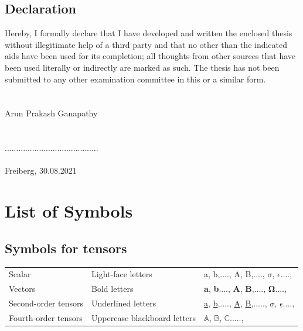 \documentclass[12pt,a4paper,twoside,openright]{report}
\begin{document}
\clearpage
\thispagestyle{empty}
\hfill
\clearpage
\vspace*{2cm}
\section*{\LARGE{Declaration} }
\vspace*{1cm}
\indent\indent\indent Hereby, I  formally declare that I  have developed and written the enclosed thesis 
without illegitimate help of a third party and that no other than the indicated aids have been used for its completion; all thoughts from other sources that have been used literally or indirectly are marked as such. The thesis has not been submitted to any other examination committee in this or a similar form.\\\\\\ Arun Prakash Ganapathy  \\\\\\ .........................................  \\\\ Freiberg, 30.08.2021





\tableofcontents
\listoffigures
\listoftables


\chapter*{List of Symbols}

\section*{Symbols for tensors}
\begin{tabular}{l l l}
Scalar  &  Light-face letters  &  a, b,...., A, B,...., $\sigma$, $\epsilon$....,\\
Vectors &  Bold letters        &  \textbf{a}, \textbf{b}...., \textbf{A}, \textbf{B},...., $\mathbf{\Omega}$....,\\
Second-order tensors  &  Underlined letters  &  \underline{a}, \underline{b},...., \underline{A}, \underline{B},....., $\underline{\sigma}$, $\underline{\epsilon}$....,\\  
Fourth-order tensors   &  Uppercase blackboard letters  &   $\mathbb{A}$, $\mathbb{B}$, $\mathbb{C}$.....,\\
\end{tabular}
\end{document}
